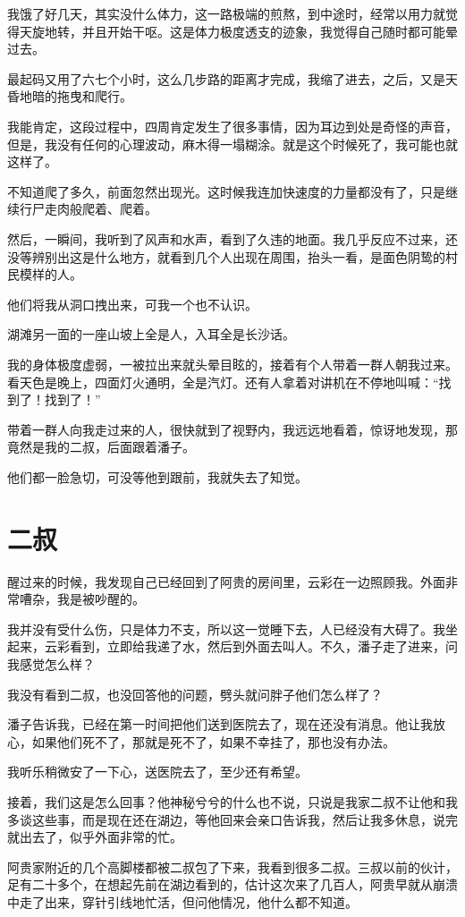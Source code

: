我饿了好几天，其实没什么体力，这一路极端的煎熬，到中途时，经常以用力就觉得天旋地转，并且开始干呕。这是体力极度透支的迹象，我觉得自己随时都可能晕过去。

最起码又用了六七个小时，这么几步路的距离才完成，我缩了进去，之后，又是天昏地暗的拖曳和爬行。

我能肯定，这段过程中，四周肯定发生了很多事情，因为耳边到处是奇怪的声音，但是，我没有任何的心理波动，麻木得一塌糊涂。就是这个时候死了，我可能也就这样了。

不知道爬了多久，前面忽然出现光。这时候我连加快速度的力量都没有了，只是继续行尸走肉般爬着、爬着。

然后，一瞬间，我听到了风声和水声，看到了久违的地面。我几乎反应不过来，还没等辨别出这是什么地方，就看到几个人出现在周围，抬头一看，是面色阴鸷的村民模样的人。

他们将我从洞口拽出来，可我一个也不认识。

湖滩另一面的一座山坡上全是人，入耳全是长沙话。

我的身体极度虚弱，一被拉出来就头晕目眩的，接着有个人带着一群人朝我过来。看天色是晚上，四面灯火通明，全是汽灯。还有人拿着对讲机在不停地叫喊：“找到了！找到了！”

带着一群人向我走过来的人，很快就到了视野内，我远远地看着，惊讶地发现，那竟然是我的二叔，后面跟着潘子。

他们都一脸急切，可没等他到跟前，我就失去了知觉。

\chapter{二叔}

醒过来的时候，我发现自己已经回到了阿贵的房间里，云彩在一边照顾我。外面非常嘈杂，我是被吵醒的。

我并没有受什么伤，只是体力不支，所以这一觉睡下去，人已经没有大碍了。我坐起来，云彩看到，立即给我递了水，然后到外面去叫人。不久，潘子走了进来，问我感觉怎么样？

我没有看到二叔，也没回答他的问题，劈头就问胖子他们怎么样了？

潘子告诉我，已经在第一时间把他们送到医院去了，现在还没有消息。他让我放心，如果他们死不了，那就是死不了，如果不幸挂了，那也没有办法。

我听乐稍微安了一下心，送医院去了，至少还有希望。

接着，我们这是怎么回事？他神秘兮兮的什么也不说，只说是我家二叔不让他和我多谈这些事，而是现在还在湖边，等他回来会亲口告诉我，然后让我多休息，说完就出去了，似乎外面非常的忙。

阿贵家附近的几个高脚楼都被二叔包了下来，我看到很多二叔。三叔以前的伙计，足有二十多个，在想起先前在湖边看到的，估计这次来了几百人，阿贵早就从崩溃中走了出来，穿针引线地忙活，但问他情况，他什么都不知道。

